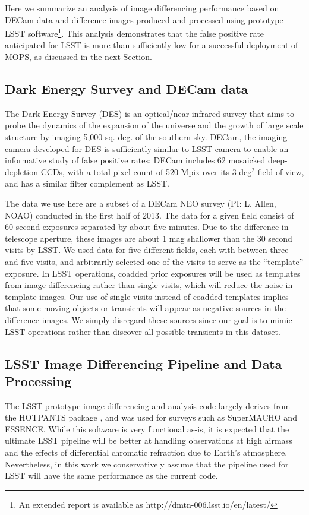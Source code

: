 Here we summarize an analysis of image differencing performance based on DECam data and 
difference images produced and processed using prototype LSST software\footnote{An extended report is available as
http://dmtn-006.lsst.io/en/latest/}.
This analysis demonstrates that the false positive rate anticipated for LSST is more than sufficiently 
low for a successful deployment of MOPS, as discussed in the next Section. 


\subsection{Dark Energy Survey and DECam data} 

The Dark Energy Survey (DES) is an optical/near-infrared survey that aims to probe the 
dynamics of the expansion of the universe and the growth of large scale structure by
imaging 5,000 sq. deg. of the southern sky. DECam, the imaging camera developed for
DES is sufficiently similar to LSST camera to enable an informative study of false positive 
rates: DECam includes 62 mosaicked deep-depletion CCDs, with a total pixel count of 
520 Mpix over its 3 deg$^2$ field of view, and has a similar filter complement as LSST. 

The data we use here are a subset of a DECam NEO survey (PI: L. Allen, NOAO) conducted 
in the first half of 2013. The data for a given field consist of 60-second exposures separated
by about five minutes. Due to the difference in telescope aperture, these images are 
about 1 mag shallower than the 30 second visits by LSST. We used data for five different 
fields, each with between three and five visits, and arbitrarily selected one of the visits to 
serve as the ``template'' exposure. In LSST operations, coadded prior exposures will be
used as templates from image differencing rather than single visits, which will reduce the 
noise in template images. Our use of single visits instead of coadded templates implies
that some moving objects or transients will appear as negative sources in the difference 
images. We simply disregard these sources since our goal is to mimic LSST operations 
rather than discover all possible transients in this dataset.


\subsection{LSST Image Differencing Pipeline and Data Processing}

The LSST prototype image differencing and analysis code largely derives from the 
HOTPANTS package \citep{becker15}, and was used for surveys such as SuperMACHO 
and ESSENCE. While this software is very functional as-is, it is expected that the 
ultimate LSST pipeline will be better at handling observations at high airmass and 
the effects of differential chromatic refraction due to Earth's atmosphere. 
Nevertheless, in this work we conservatively assume that the pipeline used for LSST 
will have the same performance as the current code. 

